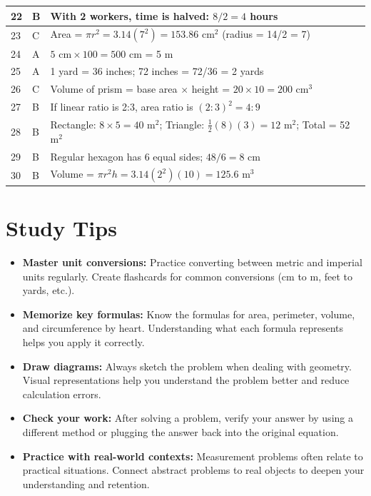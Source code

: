 \documentclass[12pt, letterpaper]{article}
\begin{document}
\begin{table}[h]
\begin{tabular}{|p{1.5cm}|p{1.5cm}|p{9.5cm}|}
\hline
22 & B & With 2 workers, time is halved: $8/2 = 4$ hours \\
\hline
23 & C & Area = $\pi r^2 = 3.14(7^2) = 153.86$ cm$^2$ (radius = 14/2 = 7) \\
\hline
24 & A & $5 \text{ cm} \times 100 = 500$ cm = 5 m \\
\hline
25 & A & 1 yard = 36 inches; 72 inches = 72/36 = 2 yards \\
\hline
26 & C & Volume of prism = base area $\times$ height = $20 \times 10 = 200$ cm$^3$ \\
\hline
27 & B & If linear ratio is 2:3, area ratio is $(2:3)^2 = 4:9$ \\
\hline
28 & B & Rectangle: $8 \times 5 = 40$ m$^2$; Triangle: $\frac{1}{2}(8)(3) = 12$ m$^2$; Total = 52 m$^2$ \\
\hline
29 & B & Regular hexagon has 6 equal sides; $48/6 = 8$ cm \\
\hline
30 & B & Volume = $\pi r^2 h = 3.14(2^2)(10) = 125.6$ m$^3$ \\
\hline
\end{tabular}
\end{table}

\vspace{1cm}

\section*{Study Tips}

\begin{itemize}
    \item \textbf{Master unit conversions:} Practice converting between metric and imperial units regularly. Create flashcards for common conversions (cm to m, feet to yards, etc.).
    
    \item \textbf{Memorize key formulas:} Know the formulas for area, perimeter, volume, and circumference by heart. Understanding what each formula represents helps you apply it correctly.
    
    \item \textbf{Draw diagrams:} Always sketch the problem when dealing with geometry. Visual representations help you understand the problem better and reduce calculation errors.
    
    \item \textbf{Check your work:} After solving a problem, verify your answer by using a different method or plugging the answer back into the original equation.
    
    \item \textbf{Practice with real-world contexts:} Measurement problems often relate to practical situations. Connect abstract problems to real objects to deepen your understanding and retention.
\end{itemize}
\end{document}
